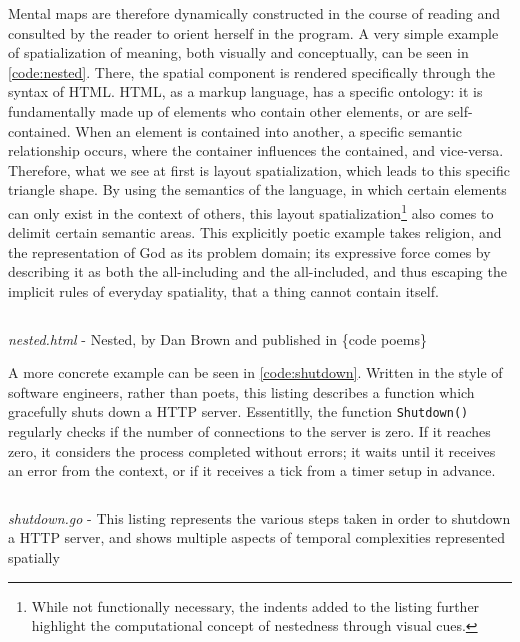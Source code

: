 Mental maps are therefore dynamically constructed in the course of reading and consulted by the reader to orient herself in the program. A very simple example of spatialization of meaning, both visually and conceptually, can be seen in \autoref{code:nested}. There, the spatial component is rendered specifically through the syntax of HTML. HTML, as a markup language, has a specific ontology: it is fundamentally made up of elements who contain other elements, or are self-contained. When an element is contained into another, a specific semantic relationship occurs, where the container influences the contained, and vice-versa. Therefore, what we see at first is layout spatialization, which leads to this specific triangle shape. By using the semantics of the language, in which certain elements can only exist in the context of others, this layout spatialization\footnote{While not functionally necessary, the indents added to the listing further highlight the computational concept of nestedness through visual cues.} also comes to delimit certain semantic areas. This explicitly poetic example takes religion, and the representation of God as its problem domain; its expressive force comes by describing it as both the all-including and the all-included, and thus escaping the implicit rules of everyday spatiality, that a thing cannot contain itself.

\begin{listing}
    \inputminted{html}{./corpus/nested.html}
    \caption{\emph{nested.html} - Nested, by Dan Brown and published in \{code poems\} \citep{bertram_code_2012}}
    \label{code:nested}
\end{listing}

A more concrete example can be seen in \autoref{code:shutdown}. Written in the style of software engineers, rather than poets, this listing describes a function which gracefully shuts down a HTTP server. Essentitlly, the function \lstinline{Shutdown()} regularly checks if the number of connections to the server is zero. If it reaches zero, it considers the process completed without errors; it waits until it receives an error from the context, or if it receives a tick from a timer setup in advance.

\begin{listing}
    \inputminted[]{go}{./corpus/shutdown.go}
    \caption{\emph{shutdown.go} - This listing represents the various steps taken in order to shutdown a HTTP server, and shows multiple aspects of temporal complexities represented spatially \citep{weidideng_caddyserver_2023}}
    \label{code:shutdown}
\end{listing}

